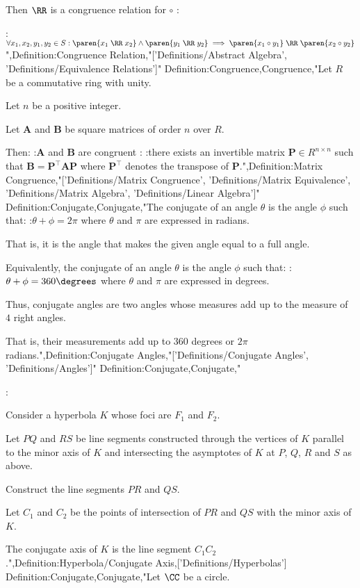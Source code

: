Then $\RR$ is a congruence relation for $\circ$ :

:$\forall x_1, x_2, y_1, y_2 \in S: \paren {x_1 \mathrel \RR x_2} \land \paren {y_1 \mathrel \RR y_2} \implies \paren {x_1 \circ y_1} \mathrel \RR \paren {x_2 \circ y_2}$",Definition:Congruence Relation,"['Definitions/Abstract Algebra', 'Definitions/Equivalence Relations']"
Definition:Congruence,Congruence,"Let $R$ be a commutative ring with unity.

Let $n$ be a positive integer.

Let $\mathbf A$ and $\mathbf B$ be square matrices of order $n$ over $R$.


Then:
:$\mathbf A$ and $\mathbf B$ are congruent
:
:there exists an invertible matrix $\mathbf P \in R^{n \times n}$ such that $\mathbf B = \mathbf P^\intercal \mathbf A \mathbf P$
where $\mathbf P^\intercal$ denotes the transpose of $\mathbf P$.",Definition:Matrix Congruence,"['Definitions/Matrix Congruence', 'Definitions/Matrix Equivalence', 'Definitions/Matrix Algebra', 'Definitions/Linear Algebra']"
Definition:Conjugate,Conjugate,"The conjugate of an angle $\theta$ is the angle $\phi$ such that:
:$\theta + \phi = 2 \pi$
where $\theta$ and $\pi$ are expressed in radians.

That is, it is the angle that makes the given angle equal to a full angle.


Equivalently, the conjugate of an angle $\theta$ is the angle $\phi$ such that:
:$\theta + \phi = 360 \degrees$
where $\theta$ and $\pi$ are expressed in degrees.


Thus, conjugate angles are two angles whose measures add up to the measure of $4$ right angles.

That is, their measurements add up to $360$ degrees or $2 \pi$ radians.",Definition:Conjugate Angles,"['Definitions/Conjugate Angles', 'Definitions/Angles']"
Definition:Conjugate,Conjugate," 

:


Consider a hyperbola $K$ whose foci are $F_1$ and $F_2$.


Let $PQ$ and $RS$ be line segments constructed through the vertices of $K$ parallel to the minor axis of $K$ and intersecting the asymptotes of $K$ at $P$, $Q$, $R$ and $S$ as above.

Construct the line segments $PR$ and $QS$.

Let $C_1$ and $C_2$ be the points of intersection of $PR$ and $QS$ with the minor axis of $K$.


The conjugate axis of $K$ is the line segment $C_1 C_2$.",Definition:Hyperbola/Conjugate Axis,['Definitions/Hyperbolas']
Definition:Conjugate,Conjugate,"Let $\CC$ be a circle.

